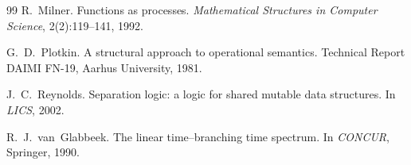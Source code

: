 \begin{thebibliography}{99}
R.~Milner.
\newblock Functions as processes.
\newblock \emph{Mathematical Structures in Computer Science}, 2(2):119--141, 1992.

G.~D.~Plotkin.
\newblock A structural approach to operational semantics.
\newblock Technical Report DAIMI FN-19, Aarhus University, 1981.

J.~C.~Reynolds.
\newblock Separation logic: a logic for shared mutable data structures.
\newblock In \emph{LICS}, 2002.

R.~J.~van~Glabbeek.
\newblock The linear time--branching time spectrum.
\newblock In \emph{CONCUR}, Springer, 1990.

\end{thebibliography}